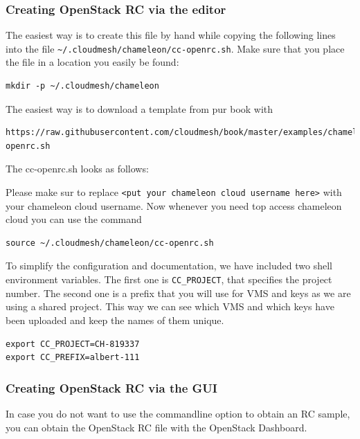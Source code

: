 \subsubsection{Creating OpenStack RC via the editor}

The easiest way is to create this file by hand while copying the
following lines into the file
\verb|~/.cloudmesh/chameleon/cc-openrc.sh|. Make sure that you place
the file in a location you easily be found:

\begin{lstlisting}
mkdir -p ~/.cloudmesh/chameleon
\end{lstlisting}

The easiest way is to download a template from pur book with 

\begin{lstlisting}
https://raw.githubusercontent.com/cloudmesh/book/master/examples/chameleon/cc-openrc.sh
\end{lstlisting}

The cc-openrc.sh looks as follows:



Please make sur to replace
\verb|<put your chameleon cloud username here>| with your
chameleon cloud username. Now whenever you need top access chameleon
cloud you can use the command

\begin{lstlisting}
source ~/.cloudmesh/chameleon/cc-openrc.sh
\end{lstlisting}

To simplify the configuration and documentation, we have included two
shell environment variables. The first one is \verb|CC_PROJECT|, that
specifies the project number. The second one is a prefix that you will
use for VMS and keys as we are using a shared project. This way we can
see which VMS and which keys have been uploaded and keep the names of
them unique.

\begin{lstlisting}
export CC_PROJECT=CH-819337
export CC_PREFIX=albert-111
\end{lstlisting}

\subsubsection{Creating OpenStack RC via the GUI}

In case you do not want to use the commandline option to obtain an RC
sample, you can obtain the OpenStack RC file with the OpenStack
Dashboard.

